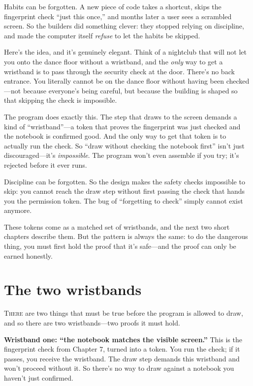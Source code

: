 \documentclass[11pt,twoside]{book}
\begin{document}
Habits can be forgotten. A new piece of code takes a shortcut, skips the
fingerprint check ``just this once,'' and months later a user sees a scrambled
screen. So the builders did something clever: they stopped relying on
discipline, and made the computer itself \emph{refuse} to let the habits be
skipped.

Here's the idea, and it's genuinely elegant. Think of a nightclub that will
not let you onto the dance floor without a wristband, and the \emph{only} way
to get a wristband is to pass through the security check at the door. There's
no back entrance. You literally cannot be on the dance floor without having
been checked---not because everyone's being careful, but because the building
is shaped so that skipping the check is impossible.

The program does exactly this. The step that draws to the screen demands a
kind of ``wristband''---a token that proves the fingerprint was just checked
and the notebook is confirmed good. And the only way to get that token is to
actually run the check. So ``draw without checking the notebook first'' isn't
just discouraged---it's \emph{impossible}. The program won't even assemble if
you try; it's rejected before it ever runs.

\begin{insight}
Discipline can be forgotten. So the design makes the safety checks impossible
to skip: you cannot reach the draw step without first passing the check that
hands you the permission token. The bug of ``forgetting to check'' simply
cannot exist anymore.
\end{insight}

These tokens come as a matched set of wristbands, and the next two short
chapters describe them. But the pattern is always the same: to do the
dangerous thing, you must first hold the proof that it's safe---and the proof
can only be earned honestly.

\chapter{The two wristbands}
\lettrine{T}{here} are two things that must be true before the program is
allowed to draw, and so there are two wristbands---two proofs it must hold.

\textbf{Wristband one: ``the notebook matches the visible screen.''} This is
the fingerprint check from Chapter 7, turned into a token. You run the check;
if it passes, you receive the wristband. The draw step demands this wristband
and won't proceed without it. So there's no way to draw against a notebook you
haven't just confirmed.
\end{document}
